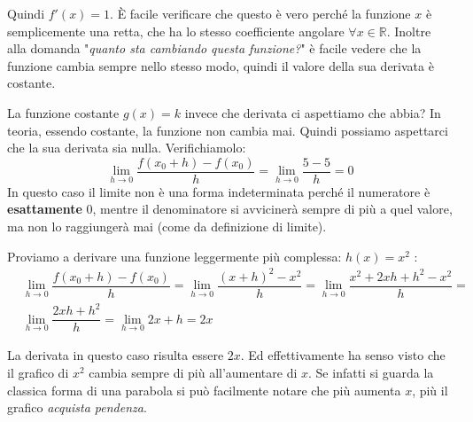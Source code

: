 Quindi $f'(x) = 1$. È facile verificare che questo è vero perché la funzione $x$ è semplicemente una retta, che ha lo stesso coefficiente angolare $\forall x \in \mathbb{R}$. Inoltre alla domanda "\textit{quanto sta cambiando questa funzione?}" è facile vedere che la funzione cambia sempre nello stesso modo, quindi il valore della sua derivata è costante.

La funzione costante $g(x) = k$ invece che derivata ci aspettiamo che abbia? In teoria, essendo costante, la funzione non cambia mai. Quindi possiamo aspettarci che la sua derivata sia nulla. Verifichiamolo:
\begin{equation*}
	\lim_{h \to 0} \dfrac{f(x_0 + h) - f(x_0)}{h} = \lim_{h \to 0} \dfrac{5 - 5}{h} = 0
\end{equation*}
In questo caso il limite non è una forma indeterminata perché il numeratore è \textbf{esattamente} $0$, mentre il denominatore si avvicinerà sempre di più a quel valore, ma non lo raggiungerà mai (come da definizione di limite).

Proviamo a derivare una funzione leggermente più complessa: $h(x) = x^2$ :
\begin{align*}
	&\lim_{h \to 0} \dfrac{f(x_0 + h) - f(x_0)}{h} = \lim_{h \to 0} \dfrac{(x+h)^2 - x^2}{h} =  \lim_{h \to 0} \dfrac{x^2 +2 x h + h^2 - x^2}{h} =\\
	&\lim_{h \to 0} \dfrac{2xh + h^2}{h} = \lim_{h \to 0} 2x + h =  2x
\end{align*}

La derivata in questo caso risulta essere $2x$. Ed effettivamente ha senso visto che il grafico di $x^2$ cambia sempre di più all'aumentare di $x$. Se infatti si guarda la classica forma di una parabola si può facilmente notare che più aumenta $x$, più il grafico \textit{acquista pendenza}.



